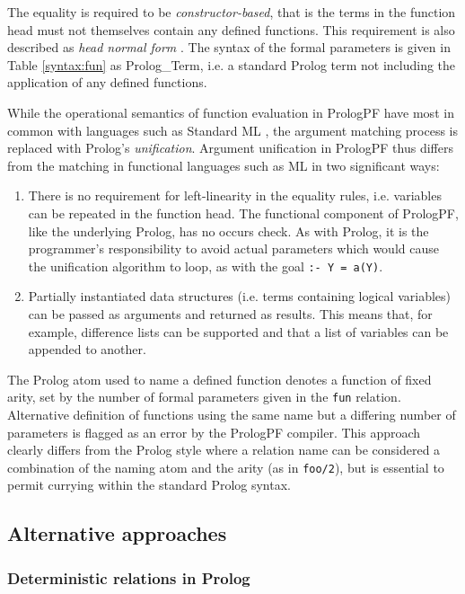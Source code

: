 The equality is required to be \textit{constructor-based}, that is the terms in the
function head must not themselves contain any defined functions. 
This requirement is also described as \textit{head normal form} \cite{HAK+97}.
The syntax of the
formal parameters is given in Table \ref{syntax:fun} as Prolog\_{}Term, i.e. a
standard Prolog term not including the application of any defined functions.

While the operational semantics of function evaluation in PrologPF 
have most in common with
languages such as Standard ML \cite{Pau91, MTH90}, the argument matching process is
replaced with Prolog's \textit{unification}.  Argument unification in PrologPF thus
differs from the matching in functional languages such as ML in two significant
ways:
\begin{enumerate}
\item{There is no requirement for left-linearity
  in the equality rules, i.e. variables can be repeated in the function head.  The
  functional component of PrologPF, like the underlying Prolog, has no occurs check.
  As with Prolog, it is the programmer's responsibility to avoid actual parameters which
  would cause the unification algorithm to loop, as with the goal \texttt{:- Y = a(Y)}.}
\item{Partially instantiated data structures (i.e. terms
  containing logical variables) can be passed as arguments and returned as results.
  This means that, for example, difference lists can be supported and that a list of 
  variables can be appended to another.}
\end{enumerate}
The Prolog atom used to name a defined function denotes a function of fixed arity, set
by the number of formal parameters given in the \texttt{fun} relation.  Alternative
definition of functions using the same name but a differing number of parameters is
flagged as an error by the PrologPF compiler.  This approach clearly differs from the
Prolog style where a relation name can be considered a combination of the naming
atom and the arity (as in \texttt{foo/2}), but is essential to permit currying within
the standard Prolog syntax.

\subsection{Alternative approaches}

\subsubsection{Deterministic relations in Prolog}

